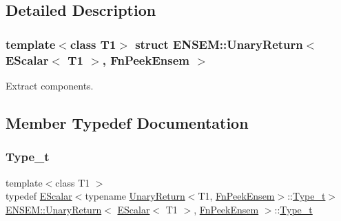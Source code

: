 \subsection{Detailed Description}
\subsubsection*{template$<$class T1$>$\newline
struct E\+N\+S\+E\+M\+::\+Unary\+Return$<$ E\+Scalar$<$ T1 $>$, Fn\+Peek\+Ensem $>$}

Extract components. 

\subsection{Member Typedef Documentation}
\mbox{\label{structENSEM_1_1UnaryReturn_3_01EScalar_3_01T1_01_4_00_01FnPeekEnsem_01_4_a6043117f7e0aff65d845b3da0fb24d01}} 
\subsubsection{\texorpdfstring{Type\_t}{Type\_t}\hspace{0.1cm}{\footnotesize\ttfamily [1/3]}}
{\footnotesize\ttfamily template$<$class T1 $>$ \\
typedef \mbox{\hyperlink{classENSEM_1_1EScalar}{E\+Scalar}}$<$typename \mbox{\hyperlink{structENSEM_1_1UnaryReturn}{Unary\+Return}}$<$T1, \mbox{\hyperlink{structENSEM_1_1FnPeekEnsem}{Fn\+Peek\+Ensem}}$>$\+::\mbox{\hyperlink{structENSEM_1_1UnaryReturn_3_01EScalar_3_01T1_01_4_00_01FnPeekEnsem_01_4_a6043117f7e0aff65d845b3da0fb24d01}{Type\+\_\+t}}$>$ \mbox{\hyperlink{structENSEM_1_1UnaryReturn}{E\+N\+S\+E\+M\+::\+Unary\+Return}}$<$ \mbox{\hyperlink{classENSEM_1_1EScalar}{E\+Scalar}}$<$ T1 $>$, \mbox{\hyperlink{structENSEM_1_1FnPeekEnsem}{Fn\+Peek\+Ensem}} $>$\+::\mbox{\hyperlink{structENSEM_1_1UnaryReturn_3_01EScalar_3_01T1_01_4_00_01FnPeekEnsem_01_4_a6043117f7e0aff65d845b3da0fb24d01}{Type\+\_\+t}}}

\mbox{\label{structENSEM_1_1UnaryReturn_3_01EScalar_3_01T1_01_4_00_01FnPeekEnsem_01_4_a6043117f7e0aff65d845b3da0fb24d01}} 
